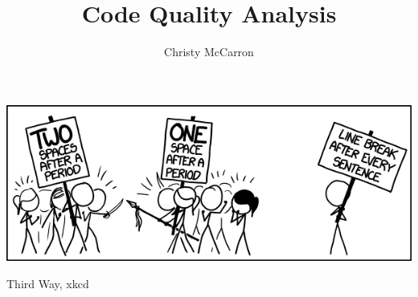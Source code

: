 \documentclass[sigconf, nonacm]{acmart}
\begin{document}
\title{Code Quality Analysis}


\author{Christy McCarron}


\begin{abstract}

\end{abstract}


\begin{teaserfigure}
  \includegraphics[width=\textwidth]{images/third_way.png}
  \caption{Third Way, xkcd}
  \label{fig:thirdWay}
\end{teaserfigure}

\maketitle




















\appendix


\end{document}
